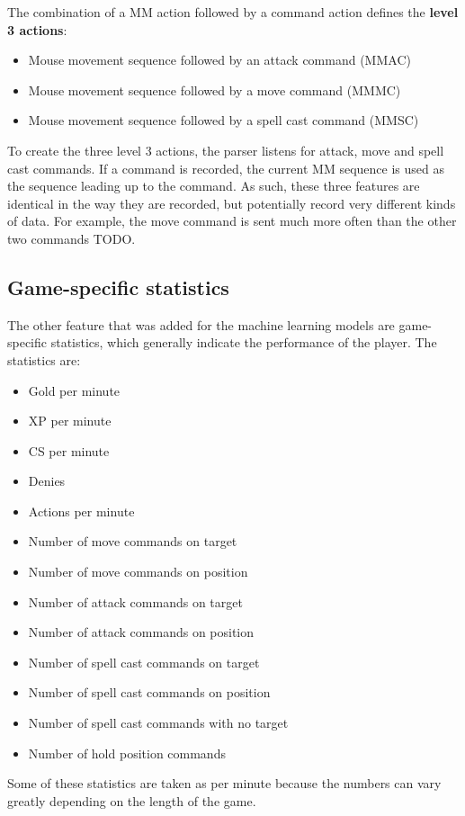 \documentclass{../sty/SizheArticle}
\begin{document}
The combination of a MM action followed by a command action defines the \textbf{level 3 actions}:
\begin{itemize}
\item Mouse movement sequence followed by an attack command (MMAC)
\item Mouse movement sequence followed by a move command (MMMC)
\item Mouse movement sequence followed by a spell cast command (MMSC)
\end{itemize}
To create the three level 3 actions, the parser listens for attack, move and spell cast commands. If a command is recorded, the current MM sequence is used as the sequence leading up to the command. As such, these three features are identical in the way they are recorded, but potentially record very different kinds of data. For example, the move command is sent much more often than the other two commands TODO. 

\subsection{Game-specific statistics}
The other feature that was added for the machine learning models are game-specific statistics, which generally indicate the performance of the player. The statistics are:
\begin{itemize}
\item Gold per minute
\item XP per minute
\item CS per minute
\item Denies
\item Actions per minute
\item Number of move commands on target
\item Number of move commands on position
\item Number of attack commands on target
\item Number of attack commands on position
\item Number of spell cast commands on target
\item Number of spell cast commands on position
\item Number of spell cast commands with no target
\item Number of hold position commands
\end{itemize}
Some of these statistics are taken as per minute because the numbers can vary greatly depending on the length of the game. 
\end{document}
